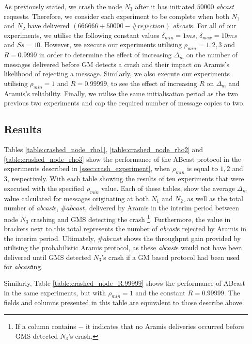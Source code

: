     As previously stated, we crash the node $N_3$ after it has initiated $50000$ \emph{abcast} requests.  Therefore, we consider each experiment to be complete when both $N_1$ and $N_2$ have delivered $(666666 + 50000 - \#rejection)$ \emph{abcast}s.  For all of our experiments, we utilise the following constant values $\delta_{min} = 1ms$, $\delta_{max} = 10ms$ and $Ss = 10$.  However, we execute our experiments utilising $\rho_{min} = 1,2,3$ and $R=0.9999$ in order to determine the effect of increasing $\Delta_m$ on the number of messages delivered before GM detects a crash and their impact on \textsf{Aramis}'s likelihood of rejecting a message.  Similarly, we also execute our experiments utilising $\rho_{min} = 1$ and $R=0.99999$, to see the effect of increasing $R$ on $\Delta_m$ and \textsf{Aramis}'s reliability.  Finally, we utilise the same initialisation period as the two previous two experiments and cap the required number of message copies to two.
    
    \subsection{Results}
    Tables \ref{table:crashed_node_rho1}, \ref{table:crashed_node_rho2} and \ref{table:crashed_node_rho3} show the performance of the \textsf{ABcast} protocol in the experiments described in \ref{ssec:crash_experiment}, when $\rho_{min}$ is equal to $1, 2$ and $3$, respectively.  With each table showing the results of ten experiments that were executed with the specified $\rho_{min}$ value.  Each of these tables, show the average $\Delta_m$ value calculated for messages originating at both $N_1$ and $N_2$, as well as the total number of \emph{abcast}s, $\#abcast$, delivered by \textsf{Aramis} in the interim period between node $N_3$ crashing and GMS detecting the crash \footnote{If a column contains $-$ it indicates that no \textsf{Aramis} deliveries occurred before GMS detected $N_3$'s crash.}.  Furthermore, the value in brackets next to this total represents the number of \emph{abcast}s rejected by \textsf{Aramis} in the interim period.  Ultimately, $\#abcast$ shows the throughput gain provided by utilising the probabilistic \textsf{Aramis} protocol, as these \emph{abcast}s would not have been delivered until GMS detected $N_3$'s crash if a GM based protocol had been used for \emph{abcast}ing.   

    Similarly, Table \ref{table:crashed_node_R.99999} shows the performance of \textsf{ABcast} in the same experiments, but with $\rho_{min} = 1$ and the constant $R = 0.99999$.  The fields and columns presented in this table are equivalent to those describe above.  
    
